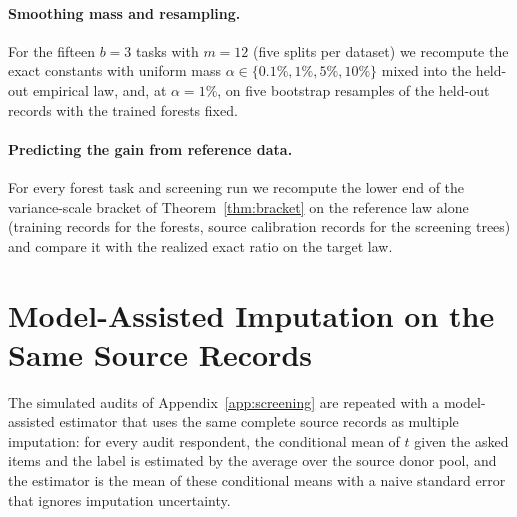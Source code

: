 \paragraph{Smoothing mass and resampling.}
For the fifteen $b=3$ tasks with $m=12$ (five splits per dataset) we recompute the exact constants with uniform mass $\alpha\in\{0.1\%,1\%,5\%,10\%\}$ mixed into the held-out empirical law, and, at $\alpha=1\%$, on five bootstrap resamples of the held-out records with the trained forests fixed.


\paragraph{Predicting the gain from reference data.}
For every forest task and screening run we recompute the lower end of the variance-scale bracket of Theorem~\ref{thm:bracket} on the reference law alone (training records for the forests, source calibration records for the screening trees) and compare it with the realized exact ratio on the target law.


\section{Model-Assisted Imputation on the Same Source Records}\label{app:regimp}
The simulated audits of Appendix~\ref{app:screening} are repeated with a model-assisted estimator that uses the same complete source records as multiple imputation: for every audit respondent, the conditional mean of $t$ given the asked items and the label is estimated by the average over the source donor pool, and the estimator is the mean of these conditional means with a naive standard error that ignores imputation uncertainty.

